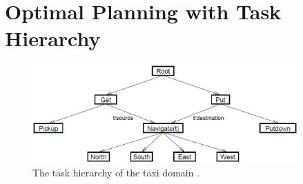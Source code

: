 
\section{Optimal Planning with Task Hierarchy}
\begin{figure}[t]
\begin{center}
    \includegraphics[width=4in] {./figures/TaxiHierarchy.eps}
\end{center}
\caption{The task hierarchy of the taxi domain \cite{MaxQJ}.}
\label{fig:taxi}
\end{figure}

